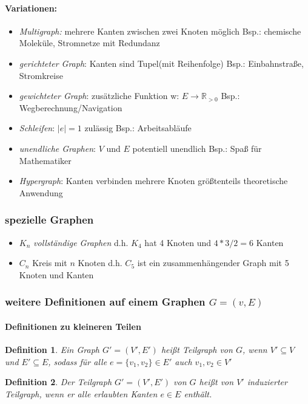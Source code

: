 \documentclass[12pt]{article}
\numberwithin{equation}{subsection}
\newtheorem{df}{Definition}
\begin{document}
	\paragraph{Variationen:}
	\begin{itemize}
		\item \textit{Multigraph:} mehrere Kanten zwischen zwei Knoten möglich
		\subitem Bsp.: chemische Moleküle, Stromnetze mit Redundanz
		\item \textit{gerichteter Graph}: Kanten sind Tupel(mit Reihenfolge)
		\subitem Bsp.: Einbahnstraße, Stromkreise
		\item \textit{gewichteter Graph}: zusätzliche Funktion w: $E\to\mathbb{R}_{>0}$
		\subitem Bsp.: Wegberechnung/Navigation
		\item \textit{Schleifen}: $|e|=1$ zulässig
		\subitem Bsp.: Arbeitsabläufe
		\item \textit{unendliche Graphen}: $V$ und $E$ potentiell unendlich
		\subitem Bsp.: Spaß für Mathematiker
		\item \textit{Hypergraph}: Kanten verbinden mehrere Knoten
		\subitem größtenteils theoretische Anwendung
	\end{itemize}
	\subsubsection{spezielle Graphen}
	\begin{itemize}
		\item $K_n$ \textit{vollständige Graphen}
		\subitem d.h. $K_4$ hat 4 Knoten und $4*3/2=6$ Kanten
		\item $C_n$ Kreis mit $n$ Knoten
		\subitem d.h. $C_5$ ist ein zusammenhängender Graph mit 5 Knoten und Kanten
	\end{itemize}
	\subsubsection{weitere Definitionen auf einem Graphen $G=(v,E)$}
	\paragraph{Definitionen zu kleineren Teilen}
	\begin{df}
		Ein Graph $G'=(V',E')$ heißt \textit{Teilgraph} von $G$, wenn $V'\subseteq V$ und $E'\subseteq E$, sodass für alle $e=\{v_1,v_2\}\in E'$ auch $v_1,v_2\in V'$
	\end{df}
	\begin{df} 
		Der Teilgraph $G'=(V',E')$ von $G$ heißt von $V'$ \textit{induzierter Teilgraph}, wenn er alle erlaubten Kanten $e\in E$ enthält.
	\end{df}
\end{document}
